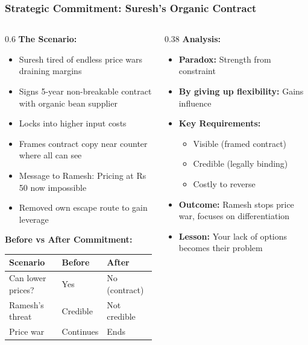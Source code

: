 \begin{frame}[fragile]\frametitle{Strategic Commitment: Suresh's Organic Contract}
\begin{columns}
    \begin{column}[T]{0.6\linewidth}
      \textbf{The Scenario:}
      \begin{itemize}
        \item Suresh tired of endless price wars draining margins
        \item Signs 5-year non-breakable contract with organic bean supplier
        \item Locks into higher input costs
        \item Frames contract copy near counter where all can see
        \item Message to Ramesh: Pricing at Rs 50 now impossible
        \item Removed own escape route to gain leverage
      \end{itemize}
      
      \vspace{6pt}
      \textbf{Before vs After Commitment:}
      \begin{center}
      \small
      \begin{tabular}{|l|l|l|}
        \hline
        \textbf{Scenario} & \textbf{Before} & \textbf{After} \\
        \hline
        Can lower prices? & Yes & No (contract) \\
        Ramesh's threat & Credible & Not credible \\
        Price war & Continues & Ends \\
        \hline
      \end{tabular}
      \end{center}
    \end{column}
    \begin{column}[T]{0.38\linewidth}
      \textbf{Analysis:}
      \begin{itemize}
        \item \textbf{Paradox:} Strength from constraint
        \item \textbf{By giving up flexibility:} Gains influence
        \item \textbf{Key Requirements:}
        \begin{itemize}
          \item Visible (framed contract)
          \item Credible (legally binding)
          \item Costly to reverse
        \end{itemize}
        \item \textbf{Outcome:} Ramesh stops price war, focuses on differentiation
        \item \textbf{Lesson:} Your lack of options becomes their problem
      \end{itemize}
    \end{column}
  \end{columns}
\end{frame}


